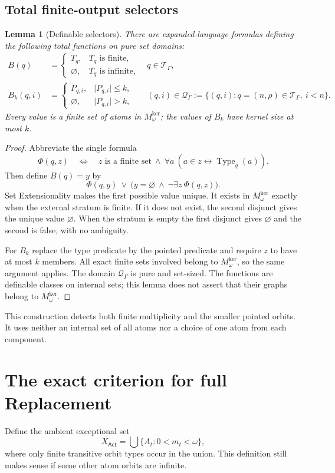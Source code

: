 \documentclass[11pt,letterpaper]{article}
\newtheorem{lemma}[lemma]{Lemma}\aliascntresetthe{lemma}
\theoremstyle{definition}
\theoremstyle{remark}
\newcommand{\Mker}{M^{\mathrm{ker}}}
\newcommand{\Act}{\mathsf{Act}}
\newcommand{\abs}[1]{\lvert #1\rvert}
\newcommand{\calT}{\mathcal T_{\Gamma}}
\newcommand{\calQ}{\mathcal Q_{\Gamma}}
\begin{document}
\subsection{Total finite-output selectors}
\begin{lemma}[Definable selectors]\label{hset:ns:lem:selectors}
There are expanded-language formulas defining the following total functions on pure set domains:
\begin{align*}
 B(q)&=
 \begin{cases}T_q,&T_q\text{ is finite},\\ \varnothing,&T_q\text{ is infinite},\end{cases}
 &&q\in\calT,\\
 B_k(q,i)&=
 \begin{cases}P_{q,i},&\abs{P_{q,i}}\le k,\\ \varnothing,&\abs{P_{q,i}}>k,\end{cases}
 &&(q,i)\in\calQ:=\{(q,i):q=(n,\rho)\in\calT,\ i<n\}.
\end{align*}
Every value is a finite set of atoms in $\Mker_\omega$; the values of $B_k$ have kernel size at most $k$.
\end{lemma}
\begin{proof}
Abbreviate the single formula
\[
 \Phi(q,z)\quad\Longleftrightarrow\quad
 z\text{ is a finite set}\ \land\
 \forall a\ (a\in z\leftrightarrow\operatorname{Type}_q(a)).
\]
Then define $B(q)=y$ by
\[
 \Phi(q,y)\ \lor\ \bigl(y=\varnothing\ \land\ \neg\exists z\ \Phi(q,z)\bigr).
\]
Set Extensionality makes the first possible value unique. It exists in $\Mker_\omega$ exactly when the external stratum is finite. If it does not exist, the second disjunct gives the unique value $\varnothing$. When the stratum is empty the first disjunct gives $\varnothing$ and the second is false, with no ambiguity.

For $B_k$ replace the type predicate by the pointed predicate and require $z$ to have at most $k$ members. All exact finite sets involved belong to $\Mker_\omega$, so the same argument applies. The domain $\calQ$ is pure and set-sized. The functions are definable classes on internal sets; this lemma does not assert that their graphs belong to $\Mker_\omega$.
\end{proof}
This construction detects both finite multiplicity and the smaller pointed orbits. It uses neither an internal set of all atoms nor a choice of one atom from each component.

\section{The exact criterion for full Replacement}
\label{hset:ns:sec:full}
Define the ambient exceptional set
\begin{equation}\label{hset:ns:eq:exceptional}
 X_{\Act}=\bigcup\{A_t:0<m_t<\omega\},
\end{equation}
where only finite transitive orbit types occur in the union. This definition still makes sense if some other atom orbits are infinite.
\end{document}
